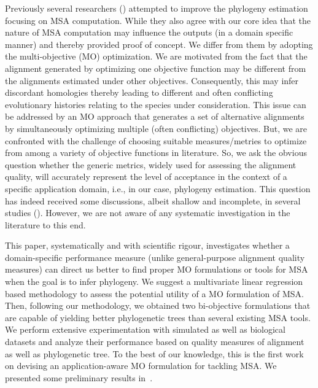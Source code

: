 Previously several researchers (\citep{redelings2005joint, ashkenazy2018multiple}) attempted to improve the phylogeny estimation focusing on MSA computation. While they also agree with our core idea that the nature of MSA computation may influence the outputs (in a domain specific manner) and thereby provided proof of concept. We differ from them by adopting the multi-objective (MO) optimization.
We are motivated from the fact that the alignment generated by optimizing one objective function may be different from the alignments estimated under other objectives. Consequently, this may infer discordant homologies thereby leading to different and often conflicting evolutionary histories relating to the species under consideration. This issue can be addressed by an MO approach that generates a set of alternative alignments by simultaneously optimizing multiple (often conflicting) objectives. But, we are confronted with the challenge of choosing suitable measures/metries to optimize from among a variety of objective functions in literature.
So, we ask the obvious question whether the generic metrics, widely used for assessing the alignment quality, will accurately represent the level of acceptance in the context of a specific application domain, i.e., in our case, phylogeny estimation.
This question has indeed received some discussions, albeit shallow and incomplete, in several studies (\citep{mirarab2015pasta, liu2009rapid}). However, we are not aware of any systematic investigation in the literature to this end. 



This paper, systematically and with scientific rigour, investigates whether a domain-specific performance measure (unlike general-purpose alignment quality measures) can direct us better to find proper MO formulations or tools for MSA when the goal is to infer phylogeny. We suggest a multivariate linear regression based methodology to assess the potential utility of a MO formulation of MSA. Then, following our methodology, we obtained two bi-objective formulations that are capable of yielding better phylogenetic trees than several existing MSA tools.
We perform extensive experimentation with simulated as well as biological datasets and analyze their performance based on quality measures of alignment as well as phylogenetic tree. 
To the best of our knowledge, this is the first work on devising an application-aware MO formulation for tackling MSA. We presented some preliminary results in~\cite{nayeem2019phylogeny}.



